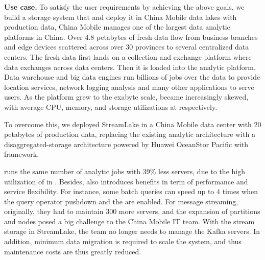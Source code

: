 \noindent \textbf{Use case.} To satisfy the user requirements by achieving the above goals, we build a storage system \sys that  and deploy it in China Mobile data lakes with production data,   China Mobile manages one of the largest data analytic platforms in China.
Over 4.8 petabytes  of fresh data flow from business branches and edge devices scattered across over 30 provinces to several centralized data centers. The fresh data first lands on a collection and exchange platform where data exchanges across data centers. Then it is loaded into the analytic platform. Data warehouse and big data engines run billions of jobs  over the data to provide location services, network logging analysis and many other applications to serve users.
As the platform grew to the exabyte scale,  became increasingly skewed, with average CPU, memory, and storage utilizations at  respectively.




To overcome this, we deployed StreamLake in a China Mobile data center with 20 petabytes of production data, replacing the existing analytic architecture with a disaggregated-storage architecture powered by Huawei OceanStor Pacific with  \sys framework.

\sys runs the same number of analytic jobs with 39\% less servers, due to the high utilization of  in \sys. Besides, \sys also introduces  benefits in term of performance and service flexibility. For instance, some batch queries can speed up to 4 times when the query operator pushdown and the \brain are enabled. 
For message streaming, originally, they had to maintain 300 more \kafka servers, and the expansion of partitions and nodes posed a big challenge to the China Mobile IT team. With the stream storage in StreamLake, the team no longer needs to  manage the Kafka servers. In addition, minimum data migration is required to scale the system, and thus maintenance costs are thus greatly reduced. 




 

